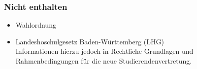 {%

\toccontents

\subsubsection*{Nicht enthalten}
\begin{itemize}
	\item Wahlordnung
	\item Landeshoschulgesetz Baden-Württemberg (LHG)\\Informationen hierzu jedoch in Rechtliche Grundlagen und Rahmenbedingungen für die neue Studierendenvertretung.
\end{itemize}

\restoregeometry

}